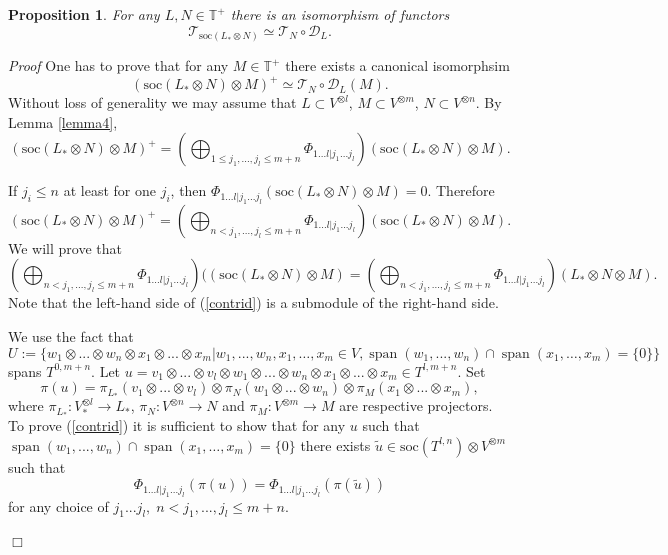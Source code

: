 \documentclass[11pt]{amsart}
\newcounter{theorem}
\newtheorem{prop}{Proposition}
\renewenvironment{proof}{ \emph{Proof}}{$\Box$}
\newcommand{\TT}{\mathbb{T}}
\newcommand{\refle}[1]{Lemma \ref{#1}}
\newcommand{\soc}{\mathrm{soc}}
\newcommand{\field}[1]{\mathbb{#1}}
\begin{document}
\begin{prop}\label{prop1} For any $L,N\in\TT^+$ there is an isomorphism of functors
$$\mathcal T_{\soc(L_*\otimes N)}\simeq  \mathcal T_N\circ\mathcal D_L.$$
\end{prop}

\begin{proof} One has to prove that
for any $M\in\field{T}^+$ there exists a canonical isomorphsim
$$(\soc( L_*\otimes N)\otimes M)^+\simeq  \mathcal T_N\circ\mathcal D_L(M).$$
Without loss of generality we may assume that $L\subset V^{\otimes  l}$, $M\subset V^{\otimes m}$, $N\subset V^{\otimes n}$.
By \refle{lemma4}, 
$$(\soc(L_*\otimes N)\otimes M)^+=\left(\bigoplus_{1\leq j_1,...,j_l\leq m+n}\Phi_{1...l|j_1...j_l}\right)(\soc(L_*\otimes N)\otimes M).$$

If $j_i\leq n$ at least for one $j_i$, then $\Phi_{1...l|j_1...j_l}(\soc(L_*\otimes N)\otimes M)=0$.
Therefore 
$$(\soc(L_*\otimes N)\otimes M)^+=\left(\bigoplus_{n< j_1,...,j_l\leq m+n}\Phi_{1...l|j_1...j_l}\right)(\soc(L_*\otimes N)\otimes M).$$
We will prove that  
\begin{equation}\label{contrid}
\left(\bigoplus_{n<j_1,...,j_l\leq
    m+n}\Phi_{1...l|j_1...j_l}\right)((\soc(L_*\otimes N)\otimes
M)=\left(\bigoplus_{n<j_1,...,j_l\leq
    m+n}\Phi_{1...l|j_1...j_l}\right)(L_*\otimes N\otimes M).
\end{equation}
Note that the left-hand side of (\ref{contrid}) is a submodule of the right-hand side. 

We use the fact that  
$$U:=\{w_1\otimes...\otimes w_n\otimes x_1\otimes ...\otimes x_m | w_1,...,w_n,x_1,\dots,x_m\in V, \operatorname{span} (w_1,...,w_n)\cap \operatorname{span} (x_1,\dots,x_m)=\{0\}\}$$
spans $T^{0,m+n}$. Let
$u=v_1\otimes ...\otimes v_l\otimes w_1\otimes ...\otimes w_n\otimes x_1\otimes ...\otimes x_m\in T^{l,m+n}$.
Set
$$\pi(u)=\pi_{L_*}(v_1\otimes ...\otimes v_l)\otimes\pi_N( w_1\otimes ...\otimes w_n)\otimes\pi_M(x_1\otimes ...\otimes x_m),$$
where $\pi_{L_*}: V_*^{\otimes l}\to L_*$, $\pi_N: V^{\otimes n}\to N$ and $\pi_M: V^{\otimes m}\to M$ are respective projectors.
To prove (\ref{contrid}) it is sufficient to show that for any $u$
such that $\operatorname{span} (w_1,...,w_n)\cap \operatorname{span} (x_1,\dots,x_m)=\{0\}$
there exists 
$\tilde{u}\in\soc (T^{l,n})\otimes V^{\otimes  m}$
such that 
\begin{equation}\label{eqs1}
\Phi_{1...l|j_1...j_l}(\pi(u))=\Phi_{1...l|j_1...j_l}(\pi(\tilde{u})) 
\end{equation}
for any choice of $j_1...j_l,\; n<j_1,...,j_l\leq m+n$.


\end{proof}
\end{document}
